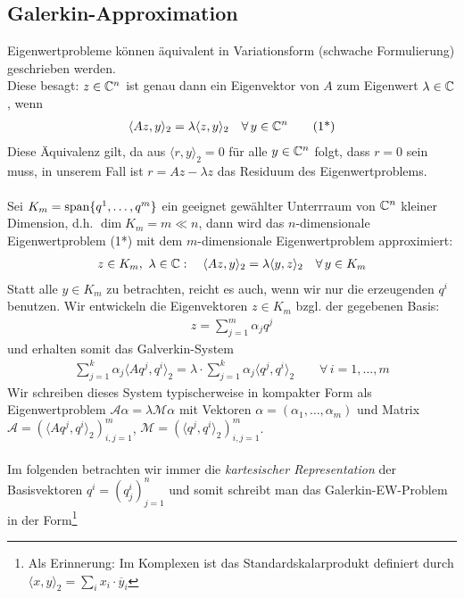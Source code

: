 \subsection{Galerkin-Approximation} 
Eigenwertprobleme können äquivalent in Variationsform (schwache Formulierung) geschrieben werden.\\
Diese besagt: $z\in\mathbb C  ^n$ ist genau dann ein Eigenvektor von $A$ zum Eigenwert $\lambda\in\mathbb C  $, wenn
\begin{align*}\langle Az,y\rangle_2 = \lambda\langle z,y\rangle_2 \quad\forall\,y\in\mathbb C  ^n\tag{1*}\end{align*}
Diese Äquivalenz gilt, da aus $\langle r, y\rangle_2 = 0$ für alle $y\in\mathbb C  ^{n}$ folgt, dass $r=0$ sein muss, 
in unserem Fall ist $r=Az-\lambda z$ das Residuum des Eigenwertproblems.\\ \\
Sei $K_m=\text{span}\{q^1,\dotsc,q^m\}$ ein geeignet gewählter Unterrraum von $\mathbb C  ^n$ kleiner Dimension, d.h. 
$\dim K_m=m\ll n$, dann wird das $n$-dimensionale Eigenwertproblem (1*) mit dem $m$-dimensionale Eigenwertproblem
approximiert: 
\begin{align*}z\in K_m, \ \lambda\in\mathbb C  : \quad \langle Az,y\rangle_2=\lambda\langle y,z\rangle_2 \quad\forall\,y\in K_m\end{align*}
Statt alle $y\in K_m$ zu betrachten, reicht es auch, wenn wir nur die erzeugenden $q^i$ benutzen. 
Wir entwickeln die Eigenvektoren $z\in K_m$ bzgl. der gegebenen Basis:
\begin{align*}z = \sum_{j=1}^{m} \alpha_j q^j\end{align*}
und erhalten somit das Galverkin-System
\begin{align*}\sum_{j=1}^{k} \alpha_j \langle Aq^j,q^i\rangle_2 = \lambda\cdot\sum_{j=1}^{k} \alpha_j \langle q^j,q^i\rangle_2
\qquad\forall\,i=1,\dotsc,m\end{align*}
Wir schreiben dieses System typischerweise in kompakter Form als Eigenwertproblem 
$\mathcal{A}\alpha = \lambda\mathcal{M}\alpha$ mit Vektoren $\alpha=(\alpha_1,\dotsc,\alpha_m)$ und Matrix 
$\mathcal{A}=(\langle Aq^j, q^i\rangle_2)_{i,j=1}^m$, 
$\mathcal{M} = (\langle q^j, q^i\rangle_2)_{i,j=1}^m$. \\ \\
Im folgenden betrachten wir immer die \textit{kartesischer Representation} der Basisvektoren $q^{i}=(q_j^i)_{j=1}^n$ 
und somit schreibt man das Galerkin-EW-Problem in der Form\footnote{
  Als Erinnerung: Im Komplexen ist das Standardskalarprodukt definiert durch 
  $\langle x,y\rangle_2 = \sum_i x_i\cdot\overline{y}_i$
}
